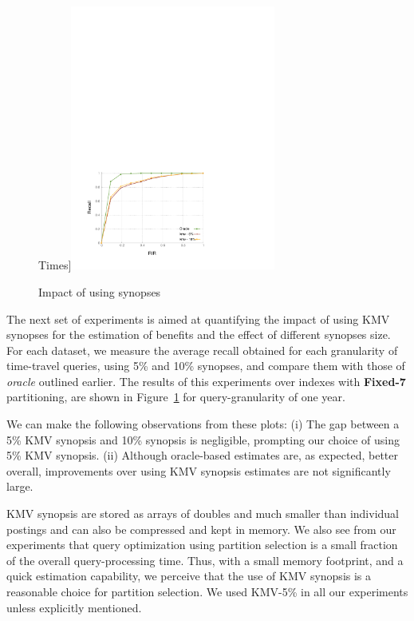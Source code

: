 \begin{figure}
  Times]{\label{fig:vary_time_nyt_psp_fixed_7d}\includegraphics[width=0.60\textwidth]{plots/selection/cc_results/round2/pdf/nyt-varying-kmv-pse-7d.pdf}}
  
  \caption{Impact of using synopses }
  \label{fig:vary_kmv}
\end{figure}

The next set of experiments is aimed at quantifying the impact of
using KMV synopses for the estimation of benefits and the effect of
different synopses size. For each dataset, we measure the average
recall obtained for each granularity of time-travel queries, using 5\%
and 10\% synopses, and compare them with those of 
\emph{oracle} outlined earlier. The results of this experiments over
indexes with \textbf{Fixed-7} partitioning, are shown in
Figure~\ref{fig:vary_kmv} for query-granularity of one year.

We can make the following observations from these plots: (i) The gap
between a 5\% KMV synopsis and 10\% synopsis is negligible,
prompting our choice of using 5\% KMV synopsis. (ii) Although oracle-based estimates are, as expected, better overall, improvements over
using KMV synopsis estimates are not significantly large. 

KMV synopsis are stored as arrays of doubles and much smaller than individual postings and can also be compressed and kept in memory. 
We also see from our experiments that query optimization using partition selection is a small fraction of the overall query-processing time. Thus, with a small memory footprint, and a quick estimation capability, we perceive that the use of KMV synopsis is a reasonable choice for partition selection. We used KMV-5\% in all our experiments unless explicitly mentioned. 

